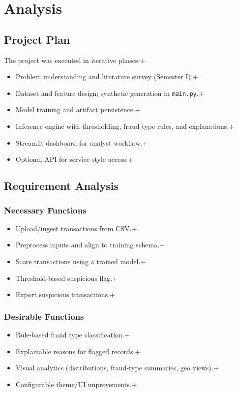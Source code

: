 \documentclass[12pt,a4paper]{report}
\begin{document}
\chapter{Analysis}
\section{Project Plan}
The project was executed in iterative phases:\n+\begin{itemize}
  \item Problem understanding and literature survey (Semester I).\n+  \item Dataset and feature design; synthetic generation in \texttt{main.py}.\n+  \item Model training and artifact persistence.\n+  \item Inference engine with thresholding, fraud type rules, and explanations.\n+  \item Streamlit dashboard for analyst workflow.\n+  \item Optional API for service-style access.\n+\end{itemize}

\section{Requirement Analysis}
\subsection{Necessary Functions}
\begin{itemize}
  \item Upload/ingest transactions from CSV.\n+  \item Preprocess inputs and align to training schema.\n+  \item Score transactions using a trained model.\n+  \item Threshold-based suspicious flag.\n+  \item Export suspicious transactions.\n+\end{itemize}
\subsection{Desirable Functions}
\begin{itemize}
  \item Rule-based fraud type classification.\n+  \item Explainable reasons for flagged records.\n+  \item Visual analytics (distributions, fraud-type summaries, geo views).\n+  \item Configurable theme/UI improvements.\n+\end{itemize}
\end{document}
